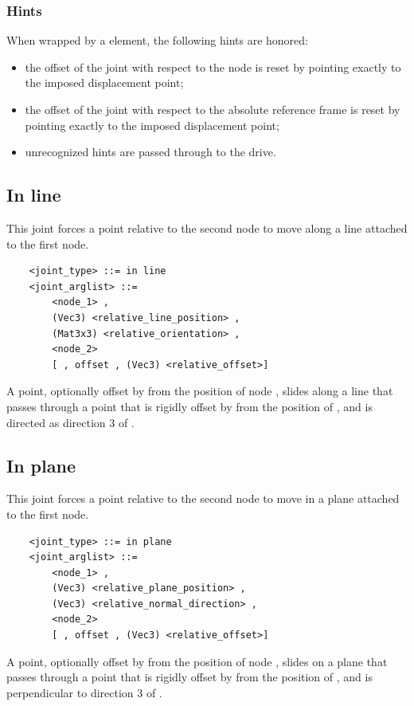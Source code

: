 \subsubsection{Hints}
When wrapped by a  element, the following hints are honored:
\begin{itemize}
\item {} the offset of the joint
with respect to the node is reset by pointing exactly
to the imposed displacement point;
\item {} the offset of the joint
with respect to the absolute reference frame is reset by pointing exactly
to the imposed displacement point;
\item unrecognized hints are passed through to the drive.
\end{itemize}




\subsection{In line}
This joint forces a point relative to the second node to move 
along a line attached to the first node.
\begin{verbatim}
    <joint_type> ::= in line
    <joint_arglist> ::= 
        <node_1> , 
        (Vec3) <relative_line_position> ,
        (Mat3x3) <relative_orientation> ,
        <node_2>
        [ , offset , (Vec3) <relative_offset>]
\end{verbatim}
A point, optionally offset by  from the position
of node , slides along a line that passes through a point 
that is rigidly offset by 
from the position of , and is directed as direction 3 
of .



\subsection{In plane}
This joint forces a point relative to the second node to move 
in a plane attached to the first node.
\begin{verbatim}
    <joint_type> ::= in plane
    <joint_arglist> ::= 
        <node_1> , 
        (Vec3) <relative_plane_position> ,
        (Vec3) <relative_normal_direction> ,
        <node_2>
        [ , offset , (Vec3) <relative_offset>]
\end{verbatim}
A point, optionally offset by  from the position
of node , slides on a plane that passes through a point 
that is rigidly offset by 
from the position of , and is perpendicular to direction 3 
of .



